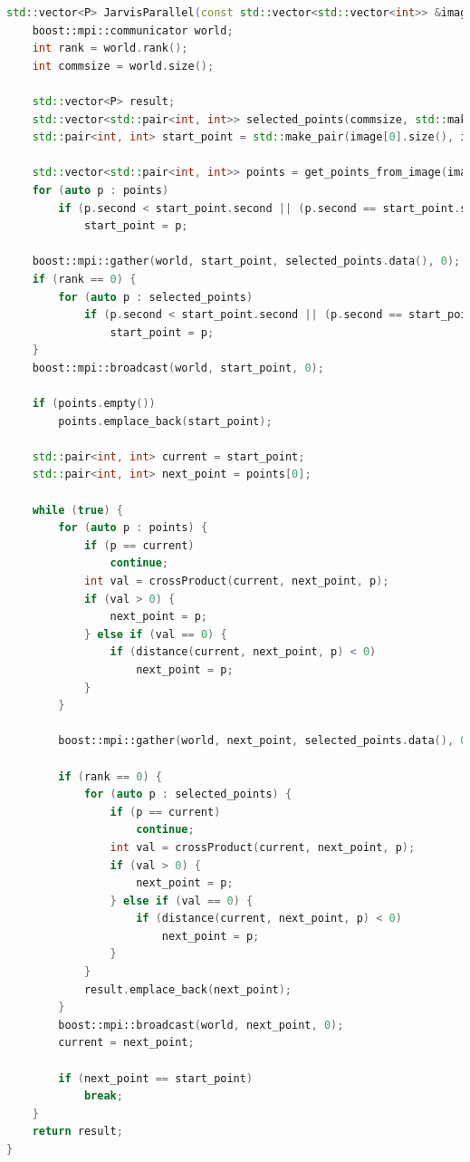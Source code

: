 \documentclass[a4paper, 12pt]{article}
\begin{document}
\newpage
\begin{lstlisting}[language=C++,caption=Параллельная версия Джарвиса]
std::vector<P> JarvisParallel(const std::vector<std::vector<int>> &image, int n) {
    boost::mpi::communicator world;
    int rank = world.rank();
    int commsize = world.size();

    std::vector<P> result;
    std::vector<std::pair<int, int>> selected_points(commsize, std::make_pair(image[0].size(), image[0].size()));
    std::pair<int, int> start_point = std::make_pair(image[0].size(), image[0].size());

    std::vector<std::pair<int, int>> points = get_points_from_image(image, n);
    for (auto p : points)
        if (p.second < start_point.second || (p.second == start_point.second && p.first < start_point.first))
            start_point = p;

    boost::mpi::gather(world, start_point, selected_points.data(), 0);
    if (rank == 0) {
        for (auto p : selected_points)
            if (p.second < start_point.second || (p.second == start_point.second && p.first < start_point.first))
                start_point = p;
    }
    boost::mpi::broadcast(world, start_point, 0);

    if (points.empty())
        points.emplace_back(start_point);

    std::pair<int, int> current = start_point;
    std::pair<int, int> next_point = points[0];

    while (true) {
        for (auto p : points) {
            if (p == current)
                continue;
            int val = crossProduct(current, next_point, p);
            if (val > 0) {
                next_point = p;
            } else if (val == 0) {
                if (distance(current, next_point, p) < 0)
                    next_point = p;
            }
        }

        boost::mpi::gather(world, next_point, selected_points.data(), 0);

        if (rank == 0) {
            for (auto p : selected_points) {
                if (p == current)
                    continue;
                int val = crossProduct(current, next_point, p);
                if (val > 0) {
                    next_point = p;
                } else if (val == 0) {
                    if (distance(current, next_point, p) < 0)
                        next_point = p;
                }
            }
            result.emplace_back(next_point);
        }
        boost::mpi::broadcast(world, next_point, 0);
        current = next_point;

        if (next_point == start_point)
            break;
    }
    return result;
}
\end{lstlisting}
\end{document}
